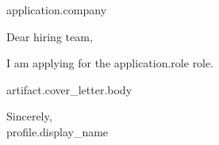 \documentclass{letter}
\begin{document}
\begin{letter}{ {{ application.company }} }
\opening{Dear hiring team,}
I am applying for the {{ application.role }} role.

{{ artifact.cover_letter.body }}

\closing{Sincerely,\\{{ profile.display_name }}}
\end{letter}
\end{document}
